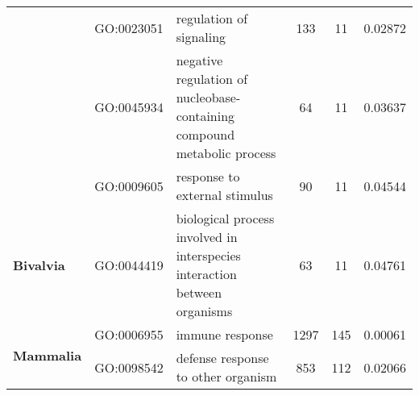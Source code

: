 \documentclass[../main.tex]{subfiles}
\begin{document}
\begin{landscape}
\begin{longtable}{@{}lllccr@{}}
		                                               & GO:0023051                         & regulation of signaling                                                   & 133                                                                & 11                                                                   & 0.02872                                                                                  \\
		                                               & GO:0045934                         & negative regulation of nucleobase-containing compound metabolic process   & 64                                                                 & 11                                                                   & 0.03637                                                                                  \\
		                                               & GO:0009605                         & response to external stimulus                                             & 90                                                                 & 11                                                                   & 0.04544                                                                                  \\
		\multirow{1}{*}{\textbf{Bivalvia}}             & GO:0044419                         & biological process involved in interspecies interaction between organisms & 63                                                                 & 11                                                                   & 0.04761                                                                                  \\* \midrule
		\multirow{22}{*}{\textbf{Mammalia}}            & GO:0006955                         & immune response                                                           & 1297                                                               & 145                                                                  & 0.00061                                                                                  \\
		                                               & GO:0098542                         & defense response to other organism                                        & 853                                                                & 112                                                                  & 0.02066                                                                                  \\

\end{longtable}
\end{landscape}
\end{document}
